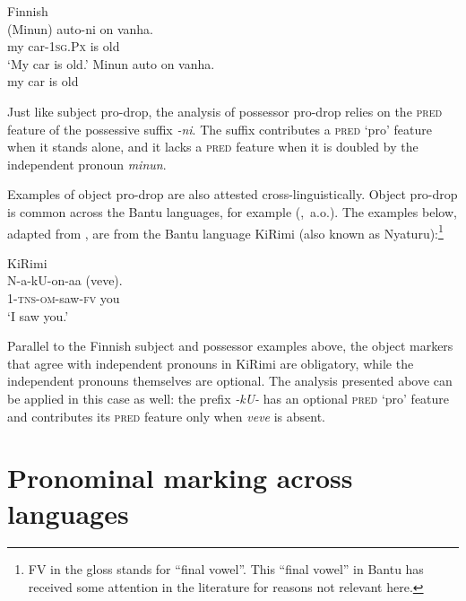 \documentclass[output=paper,hidelinks]{langscibook}
\begin{document}
\ea \label{auto} Finnish\\   
\ea \gll  (Minun) auto-ni  on  vanha.   \\
  { }my car-1\textsc{sg.Px}  is  old    \\
\glt `My  car  is  old.'
\ex  \gll *Minun auto  on  vanha.   \\
  { }my car  is  old\\     
\z\z
 


\noindent Just like   subject pro-drop,  the  analysis of   possessor  pro-drop   relies on  the \textsc{pred} feature  of  the possessive  suffix \textit{-ni}. The   suffix contributes a \textsc{pred} `pro'  feature  when it  stands alone, and  it lacks  a \textsc{pred} feature  when it  is doubled  by the independent  pronoun \textit{minun}. 

Examples of object pro-drop are also attested cross-linguistically.  Object pro-drop  is common across the Bantu languages, for example  (\citealt{BM87,  hualde89,  keach95,  riedel09},~a.o.).   The  examples  below,  adapted  from  \citet{hualde89},  are from the Bantu language KiRimi (also known as Nyaturu):\footnote{FV in the gloss stands for ``final vowel''. This ``final vowel'' in Bantu  has received some attention in the literature for reasons not relevant here. }

\ea \label{kirimi1} KiRimi\\  
\ea \gll  N-a-kU-on-aa (veve).  \\
  1-\textsc{tns}-\textsc{om}-saw-\textsc{fv} { }you   \\
\glt `I  saw  you.'
\z\z

\noindent  Parallel  to the Finnish  subject  and possessor  examples above,  the object markers that  agree  with independent  pronouns  in  KiRimi are obligatory, while  the independent pronouns  themselves are  optional. The analysis presented above  can be applied  in this case as well:  the prefix  \textit{-kU-}  has an optional  \textsc{pred}  `pro' feature  and  contributes  its  \textsc{pred} feature only when \textit{veve}  is absent.  



 


\section{Pronominal marking across languages} \label{sec:variation}
\end{document}
